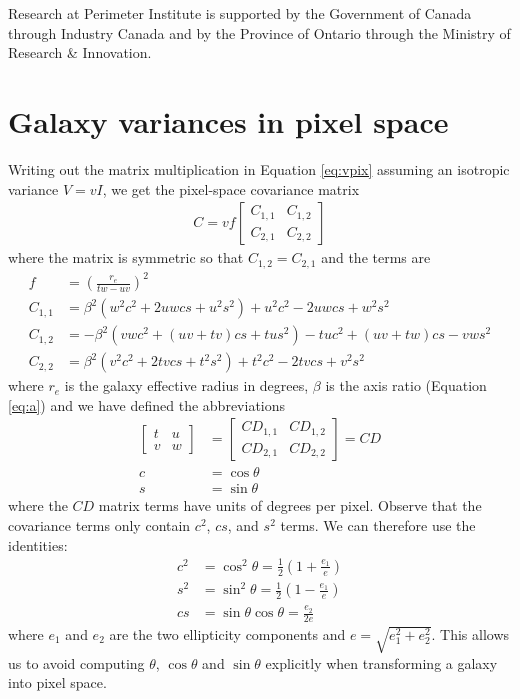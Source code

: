 \documentclass[11pt,preprint]{aastex}
\newcommand{\eqnref}[1]{Equation \ref{#1}}
\newcommand{\CD}{C\!D}
\begin{document}
Research at Perimeter Institute is supported by the Government of
Canada through Industry Canada and by the Province of Ontario through
the Ministry of Research \& Innovation.


\appendix

\section{Galaxy variances in pixel space}
\label{app:transform}

Writing out the matrix multiplication in \eqnref{eq:vpix} assuming an
isotropic variance $V = v I$, we get the pixel-space covariance matrix
\begin{align}
C = v f \begin{bmatrix}
C_{1,1} & C_{1,2} \\
C_{2,1} & C_{2,2}
\end{bmatrix}
\end{align}
where the matrix is symmetric so that $C_{1,2} = C_{2,1}$ and the terms are
\begin{align}
f & = \left( \frac{r_e}{t w - u v} \right)^2
\\
C_{1,1} & =
%
\beta^2(w^2 c^2 + 2 u w c s + u^2 s^2) + u^2 c^2 - 2 u w c s + w^2 s^2
\\
C_{1,2} & =
%
-\beta^2 (v w c^2 + (u v + t v) c s + t u s^2) - t u c^2 + (u v + t w) c s - v w s^2
\\
C_{2,2} & =
%
\beta^2 (v^2 c^2 + 2 t v c s + t^2 s^2) + t^2 c^2 - 2 t v c s + v^2 s^2
\end{align}
where $r_e$ is the galaxy effective radius in degrees,
$\beta$ is the axis ratio (\eqnref{eq:a}) and
we have defined the abbreviations
\begin{align}
\begin{bmatrix}
t & u \\
v & w
\end{bmatrix}
& = 
\begin{bmatrix}
\CD_{1,1} & \CD_{1,2} \\
\CD_{2,1} & \CD_{2,2}
\end{bmatrix}
=
\CD
\\
c &= \cos \theta \\
s &= \sin \theta
\end{align}
where the $\CD$ matrix terms have units of degrees per pixel.
Observe that the covariance terms only contain $c^2$, $cs$, and $s^2$
terms.  We can therefore use the identities:
\begin{align}
c^2 & = \cos^2 \theta            =
\tfrac{1}{2} \left(1 + \frac{e_1}{e} \right) \\
s^2 & = \sin^2 \theta            =
\tfrac{1}{2} \left(1 - \frac{e_1}{e} \right) \\
cs  & = \sin \theta \cos \theta  = %
\frac{e_2}{2 e}
\end{align}
where $e_1$ and $e_2$ are the two ellipticity components and $e =
\sqrt{e_1^2 + e_2^2}$.  This allows us to avoid computing $\theta$,
$\cos \theta$ and $\sin \theta$ explicitly when transforming a galaxy
into pixel space.
\end{document}

